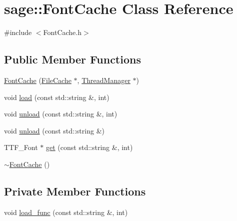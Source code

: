 \hypertarget{classsage_1_1FontCache}{}\section{sage\+::Font\+Cache Class Reference}
\label{classsage_1_1FontCache}


{\ttfamily \#include $<$Font\+Cache.\+h$>$}

\subsection*{Public Member Functions}
\begin{DoxyCompactItemize}
\item 
\mbox{\hyperlink{classsage_1_1FontCache_ae8c3c01ce64871f70b4bab669015784e}{Font\+Cache}} (\mbox{\hyperlink{classsage_1_1FileCache}{File\+Cache}} $\ast$, \mbox{\hyperlink{classsage_1_1ThreadManager}{Thread\+Manager}} $\ast$)
\item 
void \mbox{\hyperlink{classsage_1_1FontCache_a2221e34a4ddd51266f374b727baac79e}{load}} (const std\+::string \&, int)
\item 
void \mbox{\hyperlink{classsage_1_1FontCache_a0d4b71fedf081cb72eab09dc53ea251f}{unload}} (const std\+::string \&, int)
\item 
void \mbox{\hyperlink{classsage_1_1FontCache_a7c166cbed37cfeee2ea02e698e6c58d0}{unload}} (const std\+::string \&)
\item 
T\+T\+F\+\_\+\+Font $\ast$ \mbox{\hyperlink{classsage_1_1FontCache_a36e3d099603a50bc73a4d8ff6d6bc8dc}{get}} (const std\+::string \&, int)
\item 
\mbox{\hyperlink{classsage_1_1FontCache_a91c4f1c179ae27d846a9f0180ea2e0dc}{$\sim$\+Font\+Cache}} ()
\end{DoxyCompactItemize}
\subsection*{Private Member Functions}
\begin{DoxyCompactItemize}
\item 
void \mbox{\hyperlink{classsage_1_1FontCache_a9792b2e9a7db90b2c44a9ebfd8fe9067}{load\+\_\+func}} (const std\+::string \&, int)
\end{DoxyCompactItemize}
